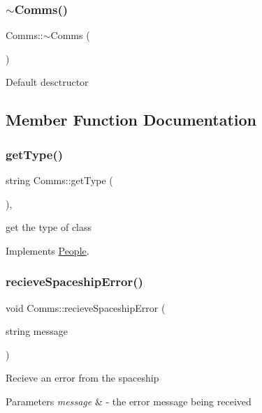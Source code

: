 \subsubsection{\texorpdfstring{$\sim$\+Comms()}{~Comms()}}
{\footnotesize\ttfamily Comms\+::$\sim$\+Comms (\begin{DoxyParamCaption}{ }\end{DoxyParamCaption})\hspace{0.3cm}{\ttfamily [inline]}}

Default desctructor 

\subsection{Member Function Documentation}
\mbox{\label{classComms_ae76ecf305b690220aa4fa68d0d798357}} 
\subsubsection{\texorpdfstring{get\+Type()}{getType()}}
{\footnotesize\ttfamily string Comms\+::get\+Type (\begin{DoxyParamCaption}{ }\end{DoxyParamCaption})\hspace{0.3cm}{\ttfamily [inline]}, {\ttfamily [virtual]}}

get the type of class 

Implements \hyperlink{classPeople_af60dd882d60cddf63f9b95815ce551a8}{People}.

\mbox{\label{classComms_a1aed1c01a813afd55309fdc59d2871bf}} 
\subsubsection{\texorpdfstring{recieve\+Spaceship\+Error()}{recieveSpaceshipError()}}
{\footnotesize\ttfamily void Comms\+::recieve\+Spaceship\+Error (\begin{DoxyParamCaption}\item[{string}]{message }\end{DoxyParamCaption})\hspace{0.3cm}{\ttfamily [virtual]}}

Recieve an error from the spaceship 
\begin{DoxyParams}{Parameters}
{\em message} & -\/ the error message being received \\
\hline
\end{DoxyParams}


